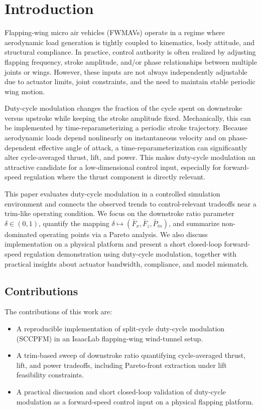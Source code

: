 \section{Introduction}
Flapping-wing micro air vehicles (FWMAVs) operate in a regime where aerodynamic load generation is tightly coupled to kinematics, body attitude, and structural compliance.
In practice, control authority is often realized by adjusting flapping frequency, stroke amplitude, and/or phase relationships between multiple joints or wings.
However, these inputs are not always independently adjustable due to actuator limits, joint constraints, and the need to maintain stable periodic wing motion.

Duty-cycle modulation changes the fraction of the cycle spent on downstroke versus upstroke while keeping the stroke amplitude fixed.
Mechanically, this can be implemented by time-reparameterizing a periodic stroke trajectory.
Because aerodynamic loads depend nonlinearly on instantaneous velocity and on phase-dependent effective angle of attack, a time-reparameterization can significantly alter cycle-averaged thrust, lift, and power.
This makes duty-cycle modulation an attractive candidate for a low-dimensional control input, especially for forward-speed regulation where the thrust component is directly relevant.

This paper evaluates duty-cycle modulation in a controlled simulation environment and connects the observed trends to control-relevant tradeoffs near a trim-like operating condition.
We focus on the downstroke ratio parameter $\delta \in (0,1)$, quantify the mapping $\delta \mapsto (\bar{F}_x, \bar{F}_z, \bar{P}_{in})$, and summarize non-dominated operating points via a Pareto analysis.
We also discuss implementation on a physical platform and present a short closed-loop forward-speed regulation demonstration using duty-cycle modulation, together with practical insights about actuator bandwidth, compliance, and model mismatch.

\subsection{Contributions}
The contributions of this work are:
\begin{itemize}
\item A reproducible implementation of split-cycle duty-cycle modulation (SCCPFM) in an IsaacLab flapping-wing wind-tunnel setup.
\item A trim-based sweep of downstroke ratio quantifying cycle-averaged thrust, lift, and power tradeoffs, including Pareto-front extraction under lift feasibility constraints.
\item A practical discussion and short closed-loop validation of duty-cycle modulation as a forward-speed control input on a physical flapping platform.
\end{itemize}
